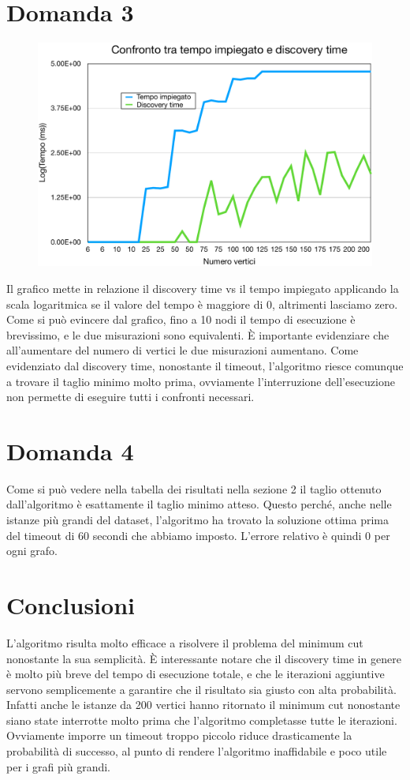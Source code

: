 \documentclass[a4paper]{article}
\begin{document}
\section{Domanda 3}
\begin{figure}[H]
	\begin{center}
	\includegraphics[width=17cm]{discoveryvsfulltime}
	\label{fig:discoveryvsfulltime}
\end{center}
\end{figure}
Il grafico mette in relazione il discovery time vs il tempo impiegato applicando la scala logaritmica se il valore del tempo è maggiore di 0, altrimenti lasciamo zero. Come si può evincere dal grafico, fino a 10 nodi il tempo di esecuzione è brevissimo, e le due misurazioni sono equivalenti. È importante evidenziare che all'aumentare del numero di vertici le due misurazioni aumentano. Come evidenziato dal discovery time, nonostante il timeout, l'algoritmo riesce comunque a trovare il taglio minimo molto prima, ovviamente l'interruzione dell'esecuzione non permette di eseguire tutti i confronti necessari. 


\section{Domanda 4}
Come si può vedere nella tabella dei risultati nella sezione 2 il taglio ottenuto dall'algoritmo è esattamente il taglio minimo atteso. Questo perché, anche nelle istanze più grandi del dataset, l'algoritmo ha trovato la soluzione ottima prima del timeout di 60 secondi che abbiamo imposto. L'errore relativo è quindi 0 per ogni grafo.

\section{Conclusioni}
L'algoritmo risulta molto efficace a risolvere il problema del minimum cut nonostante la sua semplicità. È interessante notare che il discovery time in genere è molto più breve del tempo di esecuzione totale, e che le iterazioni aggiuntive servono semplicemente a garantire che il risultato sia giusto con alta probabilità. Infatti anche le istanze da 200 vertici hanno ritornato il minimum cut nonostante siano state interrotte molto prima che l'algoritmo completasse tutte le iterazioni. Ovviamente imporre un timeout troppo piccolo riduce drasticamente la probabilità di successo, al punto di rendere l'algoritmo inaffidabile e poco utile per i grafi più grandi.
\end{document}
